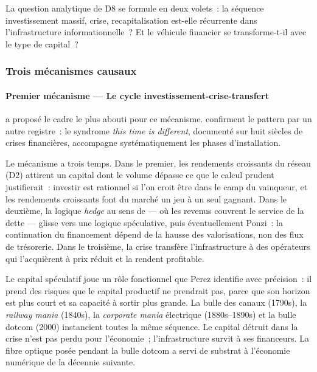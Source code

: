La question analytique de D8 se formule en deux volets~: la séquence investissement massif, crise, recapitalisation est-elle récurrente dans l'infrastructure informationnelle~? Et le véhicule financier se transforme-t-il avec le type de capital~?


\subsubsection{Trois mécanismes causaux}

\paragraph{Premier mécanisme --- Le cycle investissement-crise-transfert}

\markEVO \textcite{perez_technological_2002} a proposé le cadre le plus abouti pour ce mécanisme.  \textcite{reinhart_this_2009} confirment le pattern par un autre registre~: le syndrome \og \emph{this time is different}\fg{}, documenté sur huit siècles de crises financières, accompagne systématiquement les phases d'installation.

Le mécanisme a trois temps. Dans le premier, les rendements croissants du réseau (D2) attirent un capital dont le volume dépasse ce que le calcul prudent justifierait~: investir est rationnel si l'on croit être dans le camp du vainqueur, et les rendements croissants font du marché un jeu à un seul gagnant. Dans le deuxième, la logique \emph{hedge} au sens de \textcite{minsky_stabilizing_1986} --- où les revenus couvrent le service de la dette --- glisse vers une logique spéculative, puis éventuellement Ponzi~: la continuation du financement dépend de la hausse des valorisations, non des flux de trésorerie. Dans le troisième, la crise transfère l'infrastructure à des opérateurs qui l'acquièrent à prix réduit et la rendent profitable.

Le capital spéculatif joue un rôle fonctionnel que Perez identifie avec précision~: il prend des risques que le capital productif ne prendrait pas, parce que son horizon est plus court et sa capacité à sortir plus grande. La bulle des canaux (1790s), la \emph{railway mania} (1840s), la \emph{corporate mania} électrique (1880s--1890s) et la bulle dotcom (2000) instancient toutes la même séquence. Le capital détruit dans la crise n'est pas perdu pour l'économie~; l'infrastructure survit à ses financeurs. La fibre optique posée pendant la bulle dotcom a servi de substrat à l'économie numérique de la décennie suivante.

